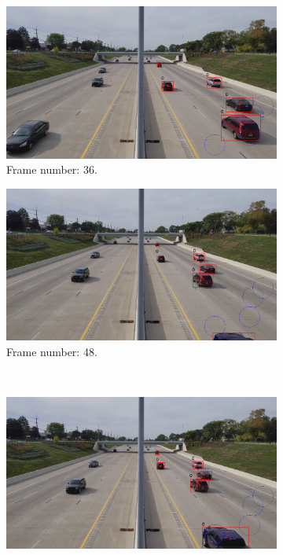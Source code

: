 \begin{figure}[H]
    \centering
    \begin{subfigure}{0.48\textwidth}
        \centering
        \includegraphics[width=\linewidth]{../../../experiments/E1/V1/YOLO/36}
        \caption{Frame number: 36.}
        \label{fig:E1-V1-S1:01}
    \end{subfigure}
    \begin{subfigure}{0.48\textwidth}
        \centering
        \includegraphics[width=\linewidth]{../../../experiments/E1/V1/YOLO/48}
        \caption{Frame number: 48.}
        \label{fig:E1-V1-S1:02}
    \end{subfigure}
    \\
    \begin{subfigure}{0.48\textwidth}
        \centering
        \includegraphics[width=\linewidth]{../../../experiments/E1/V1/YOLO/50}

\end{subfigure}
\end{figure}
